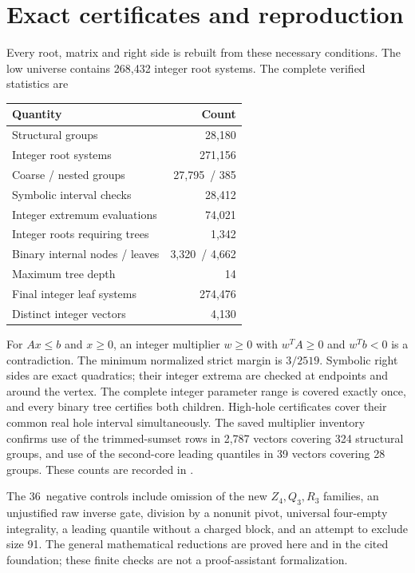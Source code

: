 \documentclass[11pt,a4paper]{article}
\newcommand{\RootGroups}{28,180}
\newcommand{\RootSystems}{271,156}
\newcommand{\CoarseGroups}{27,795}
\newcommand{\NestedGroups}{385}
\newcommand{\IntervalChecks}{28,412}
\newcommand{\ExtremumPoints}{74,021}
\newcommand{\TreeRoots}{1,342}
\newcommand{\BinaryNodes}{3,320}
\newcommand{\TreeLeaves}{4,662}
\newcommand{\MaxDepth}{14}
\newcommand{\FinalSystems}{274,476}
\newcommand{\Vectors}{4,130}
\newcommand{\MinGap}{3/2519}
\newcommand{\NegativeControls}{36}
\begin{document}
\section{Exact certificates and reproduction}
Every root, matrix and right side is rebuilt from these necessary
conditions. The low universe contains 268,432 integer root systems.
The complete verified statistics are
\begin{center}\small
\begin{tabular}{lr}\toprule
Quantity&Count\\\midrule
Structural groups&\RootGroups\\
Integer root systems&\RootSystems\\
Coarse / nested groups&\CoarseGroups\ / \NestedGroups\\
Symbolic interval checks&\IntervalChecks\\
Integer extremum evaluations&\ExtremumPoints\\
Integer roots requiring trees&\TreeRoots\\
Binary internal nodes / leaves&\BinaryNodes\ / \TreeLeaves\\
Maximum tree depth&\MaxDepth\\
Final integer leaf systems&\FinalSystems\\
Distinct integer vectors&\Vectors\\\bottomrule
\end{tabular}
\end{center}
For $Ax\le b$ and $x\ge0$, an integer multiplier $w\ge0$ with
$w^TA\ge0$ and $w^Tb<0$ is a contradiction. The minimum normalized
strict margin is $\MinGap$. Symbolic right sides are exact quadratics;
their integer extrema are checked at endpoints and around the vertex.
The complete integer parameter range is covered exactly once, and
every binary tree certifies both children. High-hole certificates
cover their common real hole interval simultaneously.
The saved multiplier inventory confirms use of the trimmed-sumset
rows in 2,787 vectors covering 324 structural groups, and use of the
second-core leading quantiles in 39 vectors covering 28 groups.
These counts are recorded in .

The \NegativeControls\ negative controls include omission of the
new $Z_4,Q_3,R_3$ families, an unjustified raw inverse gate, division
by a nonunit pivot, universal four-empty integrality, a leading
quantile without a charged block, and an attempt to exclude size 91.
The general mathematical reductions are proved here and in the cited
foundation; these finite checks are not a proof-assistant formalization.
\end{document}
